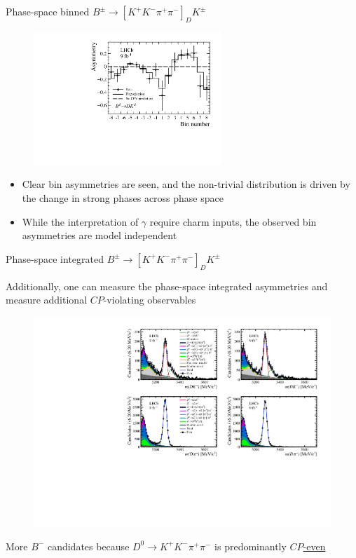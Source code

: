 \documentclass[xcolor={dvipsnames}]{beamer}
\begin{document}
\begin{frame}{Phase-space binned $B^\pm\to[K^+K^-\pi^+\pi^-]_DK^\pm$}
  \begin{figure}
    \includegraphics[height = 5cm]{Plots/BinAsymmetries_dk.pdf}
  \end{figure}
  \vspace{-0.4cm}
  \begin{itemize}
    \setlength\itemsep{0.5em}
    \item{Clear bin asymmetries are seen, and the non-trivial distribution is driven by the change in strong phases across phase space}
    \item{While the interpretation of $\gamma$ require charm inputs, the observed bin asymmetries are model independent}
  \end{itemize}
\end{frame}

\begin{frame}{Phase-space integrated $B^\pm\to[K^+K^-\pi^+\pi^-]_DK^\pm$}
  \begin{center}
    {\large Additionally, one can measure the phase-space integrated asymmetries and measure additional $C\!P$-violating observables}
  \end{center}
  \begin{figure}
    \centering
    \includegraphics[width = 1.0\textwidth,trim={0 7cm 0 0},clip=true]{Plots/d2kkpipi_fiveL_allDP_GLW.pdf}
  \end{figure}
  \begin{center}
    {\large More $B^-$ candidates because $D^0\to K^+K^-\pi^+\pi^-$ is predominantly \underline{$C\!P$-even}}
  \end{center}
\end{frame}
\end{document}
